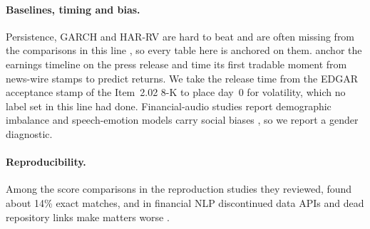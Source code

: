 \paragraph{Baselines, timing and bias.}
Persistence, GARCH and HAR-RV are hard to beat
\citep{corsi2009har,christensen2023mlvol} and are often missing from
the comparisons in this line \citep[Table~\ref{tab:faithful}]{scss2024}, so
every table here is anchored on them. \citet{fastnumbers2026} anchor the earnings timeline on the press release and time its first tradable moment from news-wire stamps to predict returns. We take the release time from the EDGAR acceptance stamp of the Item~2.02 8-K to place day~0 for volatility, which no label set in this line had done. Financial-audio studies report demographic imbalance and speech-emotion models
carry social biases \citep{ama2024,docfin2022,emobias2024}, so we report a
gender diagnostic.

\paragraph{Reproducibility.}
Among the score comparisons in the reproduction studies they reviewed,
\citet{belz2021repro} found about 14\% exact matches, and in financial NLP
discontinued data APIs and dead repository links make matters worse
\citep{finnlp2025survey}.
